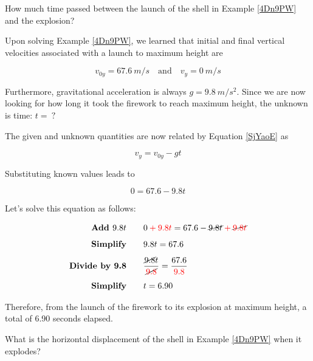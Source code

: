 \documentclass{article}
\begin{document}
\begin{example} \label{t57osh}
    How much time passed between the launch of the shell in Example \ref{4Dn9PW} and the explosion?
\end{example}

\Solution
Upon solving Example \ref{4Dn9PW}, we learned that initial and final vertical velocities associated with a launch to maximum height are

\begin{equation*}
    v_{0y} = \SI{67.6}{m/s} \quad \text{and} \quad v_y = \SI{0}{m/s}
\end{equation*}

Furthermore, gravitational acceleration is always $g = \SI{9.8}{m/s^2}$. Since we are now looking for how long it took the firework to reach maximum height, the unknown is time: $t =\ ?$

\vspace{1em}

The given and unknown quantities are now related by Equation \eqref{SjYaoE} as 

\begin{equation*}
    v_y = v_{0y} - gt
\end{equation*}

Substituting known values leads to

\begin{equation*}
    0 = 67.6 - 9.8 t
\end{equation*}

Let's solve this equation as follows:

\begin{align*}
    \textbf{Add $9.8 t$} \qquad & 0 \mathbin{\color{red} +} \textcolor{red}{9.8 t} = 67.6 - \cancel{9.8 t} \mathbin{\color{red} +} \cancel{\textcolor{red}{9.8 t}}\\[1ex]
    \textbf{Simplify} \qquad & 9.8 t = 67.6\\[1ex]
    \textbf{Divide by 9.8} \qquad & \frac{\cancel{9.8} t}{\cancel{\textcolor{red}{9.8}}} = \frac{67.6}{\textcolor{red}{9.8}}\\[1ex]
    \textbf{Simplify} \qquad & t = 6.90
\end{align*}

Therefore, from the launch of the firework to its explosion at maximum height, a total of 6.90 seconds elapsed.

\endsolution

\begin{example} 
    What is the horizontal displacement of the shell in Example \ref{4Dn9PW} when it explodes?
\end{example}
\end{document}
